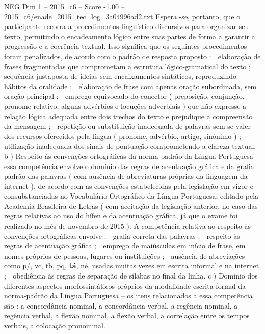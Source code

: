 \begin{textsample}{NEG Dim 1 – 2015\_c6 – Score -1.00 – 2015\_c6/enade\_2015\_tec\_log\_3a04996ad2.txt}
Espera -se, portanto, que o participante recorra a procedimentos linguístico-discursivos para organizar seu texto, permitindo o encadeamento lógico entre suas partes de forma a garantir a progressão e a coerência textual.
Isso significa que os seguintes procedimentos foram penalizados, de acordo com o padrão de resposta proposto :  elaboração de frases fragmentadas que comprometam a estrutura lógico-gramatical do texto ;  sequência justaposta de ideias sem encaixamentos sintáticos, reproduzindo hábitos da oralidade ;  elaboração de frase com apenas oração subordinada, sem oração principal ;  emprego equivocado do conector ( preposição, conjunção, pronome relativo, alguns advérbios e locuções adverbiais ) que não expresse a relação lógica adequada entre dois trechos do texto e prejudique a compreensão da mensagem ;  repetição ou substituição inadequada de palavras sem se valer dos recursos oferecidos pela língua ( pronome, advérbio, artigo, sinônimo ) ;  utilização inadequada dos sinais de pontuação comprometendo a clareza textual. b ) Respeito às convenções ortográficas da norma-padrão da Língua Portuguesa – essa competência envolve o domínio das regras de acentuação gráfica e da grafia padrão das palavras ( com ausência de abreviaturas próprias da linguagem da internet ), de acordo com as convenções estabelecidas pela legislação em vigor e consubstanciadas no Vocabulário Ortográfico da Língua Portuguesa, editado pela Academia Brasileira de Letras ( com aceitação da legislação anterior, no caso das regras relativas ao uso do hífen e da acentuação gráfica, já que o exame foi realizado no mês de novembro de 2015 ).
A competência relativa ao respeito às convenções ortográficas envolve :  grafia correta das palavras ;  respeito às regras de acentuação gráfica ;  emprego de maiúsculas em início de frase, em nomes próprios de pessoas, lugares ou instituições ;  ausência de abreviações como p/, vc, tb, pq, \textbf{tá}, né, usadas muitas vezes em escrita informal e na internet ;  obediência às regras de separação de sílabas no final da linha. c ) Domínio dos diferentes aspectos morfossintáticos próprios da modalidade escrita formal da norma-padrão da Língua Portuguesa – os itens relacionados a essa competência são : a concordância nominal, a concordância verbal, a regência nominal, a regência verbal, a flexão nominal, a flexão verbal, a correlação entre os tempos verbais, a colocação pronominal.

\end{textsample}

